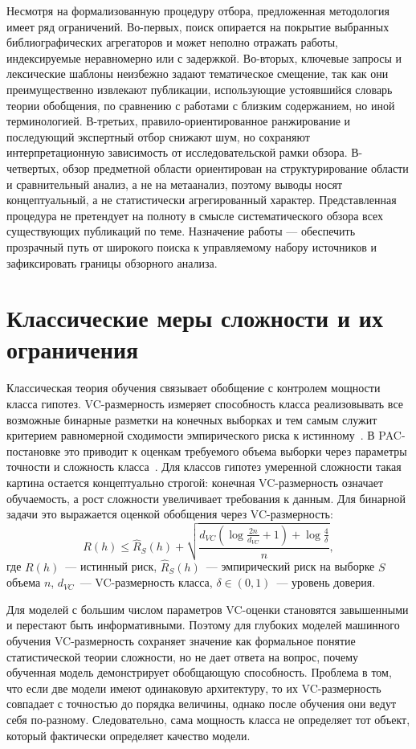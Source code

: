 Несмотря на формализованную процедуру отбора, предложенная методология имеет ряд ограничений.
Во-первых, поиск опирается на покрытие выбранных библиографических агрегаторов и может неполно отражать работы, индексируемые неравномерно или с задержкой.
Во-вторых, ключевые запросы и лексические шаблоны неизбежно задают тематическое смещение, так как они преимущественно извлекают публикации, использующие устоявшийся словарь теории обобщения, по сравнению с работами с близким содержанием, но иной терминологией.
В-третьих, правило-ориентированное ранжирование и последующий экспертный отбор снижают шум, но сохраняют интерпретационную зависимость от исследовательской рамки обзора.
В-четвертых, обзор предметной области ориентирован на структурирование области и сравнительный анализ, а не на метаанализ, поэтому выводы носят концептуальный, а не статистически агрегированный характер.
Представленная процедура не претендует на полноту в смысле систематического обзора всех существующих публикаций по теме.
Назначение работы --- обеспечить прозрачный путь от широкого поиска к управляемому набору источников и зафиксировать границы обзорного анализа.

\section{Классические меры сложности и их ограничения}
Классическая теория обучения связывает обобщение с контролем мощности класса гипотез.
VC-размерность измеряет способность класса реализовывать все возможные бинарные разметки на конечных выборках и тем самым служит критерием равномерной сходимости эмпирического риска к истинному~\cite{vapnik1971uniform,vapnik1998statistical}.
В PAC-постановке это приводит к оценкам требуемого объема выборки через параметры точности и сложность класса~\cite{valiant1984theory}.
Для классов гипотез умеренной сложности такая картина остается концептуально строгой: конечная VC-размерность означает обучаемость, а рост сложности увеличивает требования к данным.
Для бинарной задачи это выражается оценкой обобщения через VC-размерность:
\begin{equation}
R(h)\le \hat R_S(h)+\sqrt{\frac{d_{VC}\!\left(\log\frac{2n}{d_{VC}}+1\right)+\log\frac{4}{\delta}}{n}},
\label{eq:vc_bound}
\end{equation}
где $R(h)$~--- истинный риск, $\hat R_S(h)$~--- эмпирический риск на выборке $S$ объема $n$, $d_{VC}$~--- VC-размерность класса, $\delta\in(0,1)$~--- уровень доверия.

Для моделей с большим числом параметров VC-оценки становятся завышенными и перестают быть информативными.
Поэтому для глубоких моделей машинного обучения VC-размерность сохраняет значение как формальное понятие статистической теории сложности, но не дает ответа на вопрос, почему обученная модель демонстрирует обобщающую способность.
Проблема в том, что если две модели имеют одинаковую архитектуру, то их VC-размерность совпадает с точностью до порядка величины, однако после обучения они ведут себя по-разному.
Следовательно, сама мощность класса не определяет тот объект, который фактически определяет качество модели.

